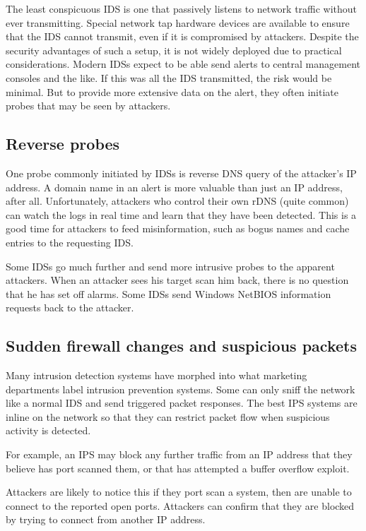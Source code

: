 The least conspicuous IDS is one that passively listens to network traffic without ever transmitting. 
Special network tap hardware devices are available to ensure that the IDS cannot transmit, even if it is 
compromised by attackers. Despite the security advantages of such a setup, it is not widely deployed due to 
practical considerations. Modern IDSs expect to be able send alerts to central management consoles and the like. 
If this was all the IDS transmitted, the risk would be minimal. 
But to provide more extensive data on the alert, they often initiate probes that may be seen by attackers.

\subsection{Reverse probes}
One probe commonly initiated by IDSs is reverse DNS query of the attacker's IP address. 
A domain name in an alert is more valuable than just an IP address, after all. 
Unfortunately, attackers who control their own rDNS (quite common) can watch the logs in real time and learn that they have been detected. 
This is a good time for attackers to feed misinformation, such as bogus names and cache entries to the requesting IDS.

Some IDSs go much further and send more intrusive probes to the apparent attackers. When an attacker sees his target scan him back, 
there is no question that he has set off alarms. 
Some IDSs send Windows NetBIOS information requests back to the attacker.

\subsection{Sudden firewall changes and suspicious packets}
Many intrusion detection systems have morphed into what marketing departments label intrusion prevention systems. 
Some can only sniff the network like a normal IDS and send triggered packet responses. 
The best IPS systems are inline on the network so that they can restrict packet flow when suspicious activity is detected.

For example, an IPS may block any further traffic from an IP address that they believe has port scanned them, 
or that has attempted a buffer overflow exploit. 

Attackers are likely to notice this if they port scan a system, then are unable to connect to the reported open ports. 
Attackers can confirm that they are blocked by trying to connect from another IP address.

